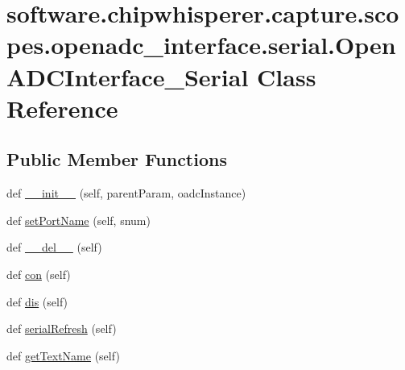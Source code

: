 \hypertarget{classsoftware_1_1chipwhisperer_1_1capture_1_1scopes_1_1openadc__interface_1_1serial_1_1OpenADCInterface__Serial}{}\section{software.\+chipwhisperer.\+capture.\+scopes.\+openadc\+\_\+interface.\+serial.\+Open\+A\+D\+C\+Interface\+\_\+\+Serial Class Reference}
\label{classsoftware_1_1chipwhisperer_1_1capture_1_1scopes_1_1openadc__interface_1_1serial_1_1OpenADCInterface__Serial}
\subsection*{Public Member Functions}
\begin{DoxyCompactItemize}
\item 
def \hyperlink{classsoftware_1_1chipwhisperer_1_1capture_1_1scopes_1_1openadc__interface_1_1serial_1_1OpenADCInterface__Serial_ae7ca7462276678f7f2be19502724d52e}{\+\_\+\+\_\+init\+\_\+\+\_\+} (self, parent\+Param, oadc\+Instance)
\item 
def \hyperlink{classsoftware_1_1chipwhisperer_1_1capture_1_1scopes_1_1openadc__interface_1_1serial_1_1OpenADCInterface__Serial_acc5deea62ac2a09829ccaef4137edb0c}{set\+Port\+Name} (self, snum)
\item 
def \hyperlink{classsoftware_1_1chipwhisperer_1_1capture_1_1scopes_1_1openadc__interface_1_1serial_1_1OpenADCInterface__Serial_ab5b82639fe6f339efffb0c4874529f05}{\+\_\+\+\_\+del\+\_\+\+\_\+} (self)
\item 
def \hyperlink{classsoftware_1_1chipwhisperer_1_1capture_1_1scopes_1_1openadc__interface_1_1serial_1_1OpenADCInterface__Serial_aed62d51a9e014cfc0186e6a6fa63753f}{con} (self)
\item 
def \hyperlink{classsoftware_1_1chipwhisperer_1_1capture_1_1scopes_1_1openadc__interface_1_1serial_1_1OpenADCInterface__Serial_adb5dd30838dc759890a5272c5cd99e37}{dis} (self)
\item 
def \hyperlink{classsoftware_1_1chipwhisperer_1_1capture_1_1scopes_1_1openadc__interface_1_1serial_1_1OpenADCInterface__Serial_a5dfb8cd9fa518d3aadf8a987a51e4132}{serial\+Refresh} (self)
\item 
def \hyperlink{classsoftware_1_1chipwhisperer_1_1capture_1_1scopes_1_1openadc__interface_1_1serial_1_1OpenADCInterface__Serial_a68107476b9b643bfc3e0559d61b04d7c}{get\+Text\+Name} (self)
\end{DoxyCompactItemize}

